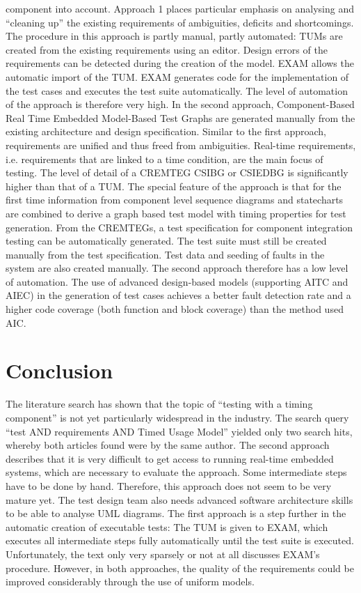 component into account. Approach 1 places particular emphasis on analysing
and \enquote{cleaning up} the existing requirements
of ambiguities, deficits and shortcomings. The procedure in this approach
is partly manual, partly automated: TUMs are created from the existing
requirements using an editor. Design errors of the requirements can
be detected during the creation of the model. EXAM allows the automatic
import of the TUM. EXAM generates code for the implementation of the
test cases and executes the test suite automatically. The level of
automation of the approach is therefore very high. In the second approach,
Component-Based Real Time Embedded Model-Based Test Graphs are generated
manually from the existing architecture and design specification.
Similar to the first approach, requirements are unified and thus freed
from ambiguities. Real-time requirements, i.e. requirements that are
linked to a time condition, are the main focus of testing. The level
of detail of a CREMTEG CSIBG or CSIEDBG is significantly higher than
that of a TUM. The special feature of the approach is that for the
first time information from component level sequence diagrams and
statecharts are combined to derive a graph based test model with timing
properties for test generation. From the CREMTEGs, a test specification
for component integration testing can be automatically generated.
The test suite must still be created manually from the test specification.
Test data and seeding of faults in the system are also created manually.
The second approach therefore has a low level of automation. The use
of advanced design-based models (supporting AITC and AIEC) in the
generation of test cases achieves a better fault detection rate and
a higher code coverage (both function and block coverage) than the
method used AIC.

\section{Conclusion\label{sec:Conclusion}}

The literature search has shown that the topic of \enquote{testing
with a timing component} is not yet particularly widespread
in the industry. The search query \enquote{test AND requirements
AND Timed Usage Model} yielded only two
search hits, whereby both articles found were by the same author.
The second approach describes that it is very difficult to get access
to running real-time embedded systems, which are necessary to evaluate
the approach. Some intermediate steps have to be done by hand. Therefore,
this approach does not seem to be very mature yet. The test design
team also needs advanced software architecture skills to be able to
analyse UML diagrams. The first approach is a step further in the
automatic creation of executable tests: The TUM is given to EXAM,
which executes all intermediate steps fully automatically until the
test suite is executed. Unfortunately, the text only very sparsely
or not at all discusses EXAM's procedure. However, in both approaches,
the quality of the requirements could be improved considerably through
the use of uniform models.\\
\nocite{*}
